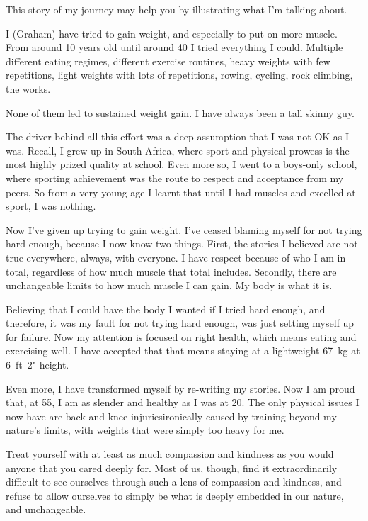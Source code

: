 This story of my journey may help you by illustrating what I'm talking about.
\begin{longstoryblock}
I (Graham) have tried to gain weight, and especially to put on more muscle. From around 10 years old until around 40 I tried everything I could. Multiple different eating regimes, different exercise routines, heavy weights with few repetitions, light weights with lots of repetitions, rowing, cycling, rock climbing, the works. 


None of them led to sustained weight gain. I have always been a tall skinny guy. 


The driver behind all this effort was a deep assumption that I was not OK as I was. Recall, I grew up in South Africa, where sport and physical prowess is the most highly prized quality at school. Even more so, I went to a boys-only school, where sporting achievement was the route to respect and acceptance from my peers. So from a very young age I learnt that until I had muscles and excelled at sport, I was nothing. 


Now I've given up trying to gain weight. I've ceased blaming myself for not trying hard enough, because I now know two things. First, the stories I believed are not true everywhere, always, with everyone. I have respect because of who I am in total, regardless of how much muscle that total includes. Secondly, there are unchangeable limits to how much muscle I can gain. My body is what it is. 


Believing that I could have the body I wanted if I tried hard enough, and therefore, it was my fault for not trying hard enough, was just setting myself up for failure. Now my attention is focused on right health, which means eating and exercising well. I have accepted that that means staying at a lightweight 67~kg at 6~ft~2" height. 


Even more, I have transformed myself by re-writing my stories. Now I am proud that, at 55, I am as slender and healthy as I was at 20. The only physical issues I now have are back and knee injuries\textemdash ironically caused by training beyond my nature’s limits, with weights that were simply too heavy for me.
\end{longstoryblock}


Treat yourself with at least as much compassion and kindness as you would anyone that you cared deeply for. Most of us, though, find it extraordinarily difficult to see ourselves through such a lens of compassion and kindness, and refuse to allow ourselves to simply be what is deeply embedded in our nature, and unchangeable.


